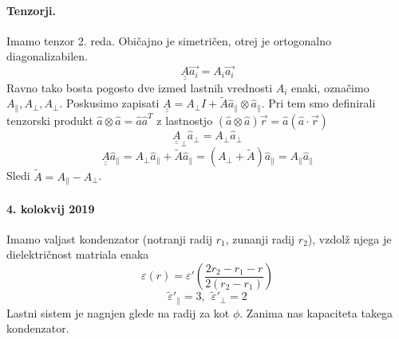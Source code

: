 \documentclass[a4paper]{article}
\newcommand{\vct}[1]{\overrightarrow{#1}}
\newcommand{\duline}[1]{\underline{\underline{#1}}}
\begin{document}
\paragraph{Tenzorji.} Imamo tenzor 2. reda. Običajno je simetričen, otrej je ortogonalno diagonalizabilen.
$$\duline{A}\vct{a_i} = A_i\vct{a_i}$$
Ravno tako bosta pogosto dve izmed lastnih vrednosti $A_i$ enaki, označimo $A_\parallel, A_\perp, A_\perp$.
Poskusimo zapisati $\duline{A} = A_\perp I + \tilde{A}\widehat{a}_\parallel \otimes \widehat{a}_\parallel$.
Pri tem smo definirali tenzorski produkt $\widehat{a}\otimes\widehat{a} = \widehat{a}\widehat{a}^T$ z lastnostjo $(\widehat{a} \otimes \widehat{a})\vct{r} = \widehat{a}(\widehat{a} \cdot \vct{r})$
$$\duline{A}_\perp \widehat{a}_\perp= A_\perp \widehat{a}_\perp$$
$$\duline{A}\widehat{a}_\parallel = A_\perp \widehat{a}_\parallel + \tilde{A} \widehat{a}_\parallel = (A_\perp + \tilde{A})\widehat{a}_\parallel = A_\parallel \widehat{a}_\parallel$$
Sledi $\tilde{A} = A_\parallel - A_\perp$.
\paragraph{4. kolokvij 2019} Imamo valjast kondenzator (notranji radij $r_1$, zunanji radij $r_2$), vzdolž njega je dielektričnost matriala enaka
$$\varepsilon(r) = \varepsilon'\left(\frac{2r_2 - r_1 - r}{2(r_2 - r_1)}\right)$$
$$\tilde{\varepsilon}'_\parallel = 3,~~\tilde{\varepsilon}'_\perp = 2$$
Lastni sistem je nagnjen glede na radij za kot $\phi$.
Zanima nas kapaciteta takega kondenzator.
\end{document}
